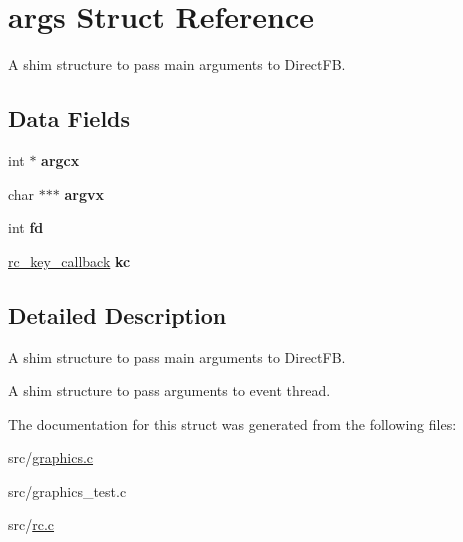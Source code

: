 \hypertarget{structargs}{}\section{args Struct Reference}
\label{structargs}


A shim structure to pass main arguments to Direct\+FB.  


\subsection*{Data Fields}
\begin{DoxyCompactItemize}
\item 
int $\ast$ {\bfseries argcx}\hypertarget{structargs_a99fcb408f8f8539bdbdbce4d1ecc095d}{}\label{structargs_a99fcb408f8f8539bdbdbce4d1ecc095d}

\item 
char $\ast$$\ast$$\ast$ {\bfseries argvx}\hypertarget{structargs_a7e93bd8833dbe96d842f2d0c66c17564}{}\label{structargs_a7e93bd8833dbe96d842f2d0c66c17564}

\item 
int {\bfseries fd}\hypertarget{structargs_a02040157e81d1605fa863f38aa84a33e}{}\label{structargs_a02040157e81d1605fa863f38aa84a33e}

\item 
\hyperlink{group__rc_gaa7ca8d3e24ef0c270366ce6fd9bcd258}{rc\+\_\+key\+\_\+callback} {\bfseries kc}\hypertarget{structargs_ab740b1462c2f18e7fa232d5604365b2c}{}\label{structargs_ab740b1462c2f18e7fa232d5604365b2c}

\end{DoxyCompactItemize}


\subsection{Detailed Description}
A shim structure to pass main arguments to Direct\+FB. 

A shim structure to pass arguments to event thread. 

The documentation for this struct was generated from the following files\+:\begin{DoxyCompactItemize}
\item 
src/\hyperlink{graphics_8c}{graphics.\+c}\item 
src/graphics\+\_\+test.\+c\item 
src/\hyperlink{rc_8c}{rc.\+c}\end{DoxyCompactItemize}
